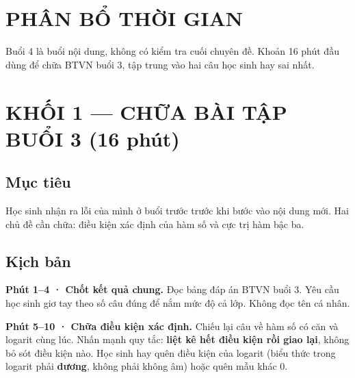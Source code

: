 \documentclass[11pt, a4paper]{article}
\begin{document}

\section{PHÂN BỔ THỜI GIAN}


Buổi 4 là buổi nội dung, không có kiểm tra cuối chuyên đề. Khoản 16 phút đầu dùng để chữa BTVN buổi 3, tập trung vào hai câu học sinh hay sai nhất.

\section{KHỐI 1 — CHỮA BÀI TẬP BUỔI 3 (16 phút)}

\subsection{Mục tiêu}

Học sinh nhận ra lỗi của mình ở buổi trước trước khi bước vào nội dung mới. Hai chủ đề cần chữa: điều kiện xác định của hàm số và cực trị hàm bậc ba.

\subsection{Kịch bản}

\textbf{Phút 1–4 · Chốt kết quả chung.} Đọc bảng đáp án BTVN buổi 3. Yêu cầu học sinh giơ tay theo số câu đúng để nắm mức độ cả lớp. Không đọc tên cá nhân.

\textbf{Phút 5–10 · Chữa điều kiện xác định.} Chiếu lại câu về hàm số có căn và logarit cùng lúc. Nhấn mạnh quy tắc: \textbf{liệt kê hết điều kiện rồi giao lại}, không bỏ sót điều kiện nào. Học sinh hay quên điều kiện của logarit (biểu thức trong logarit phải \textbf{dương}, không phải không âm) hoặc quên mẫu khác $0$.
\end{document}
